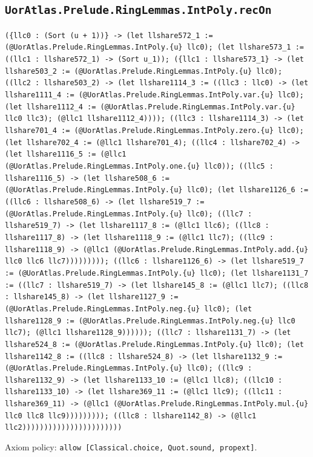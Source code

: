 \documentclass[11pt]{article}
\begin{document}
\subsection*{\texttt{UorAtlas.Prelude.RingLemmas.IntPoly.recOn}}
\noindent\texttt{(\{llc0 : (Sort (u + 1))\} -> (let llshare572\_1 := (@UorAtlas.Prelude.RingLemmas.IntPoly.\{u\} llc0); (let llshare573\_1 := ((llc1 : llshare572\_1) -> (Sort u\_1)); (\{llc1 : llshare573\_1\} -> (let llshare503\_2 := (@UorAtlas.Prelude.RingLemmas.IntPoly.\{u\} llc0); ((llc2 : llshare503\_2) -> (let llshare1114\_3 := ((llc3 : llc0) -> (let llshare1111\_4 := (@UorAtlas.Prelude.RingLemmas.IntPoly.var.\{u\} llc0); (let llshare1112\_4 := (@UorAtlas.Prelude.RingLemmas.IntPoly.var.\{u\} llc0 llc3); (@llc1 llshare1112\_4)))); ((llc3 : llshare1114\_3) -> (let llshare701\_4 := (@UorAtlas.Prelude.RingLemmas.IntPoly.zero.\{u\} llc0); (let llshare702\_4 := (@llc1 llshare701\_4); ((llc4 : llshare702\_4) -> (let llshare1116\_5 := (@llc1 (@UorAtlas.Prelude.RingLemmas.IntPoly.one.\{u\} llc0)); ((llc5 : llshare1116\_5) -> (let llshare508\_6 := (@UorAtlas.Prelude.RingLemmas.IntPoly.\{u\} llc0); (let llshare1126\_6 := ((llc6 : llshare508\_6) -> (let llshare519\_7 := (@UorAtlas.Prelude.RingLemmas.IntPoly.\{u\} llc0); ((llc7 : llshare519\_7) -> (let llshare1117\_8 := (@llc1 llc6); ((llc8 : llshare1117\_8) -> (let llshare1118\_9 := (@llc1 llc7); ((llc9 : llshare1118\_9) -> (@llc1 (@UorAtlas.Prelude.RingLemmas.IntPoly.add.\{u\} llc0 llc6 llc7))))))))); ((llc6 : llshare1126\_6) -> (let llshare519\_7 := (@UorAtlas.Prelude.RingLemmas.IntPoly.\{u\} llc0); (let llshare1131\_7 := ((llc7 : llshare519\_7) -> (let llshare145\_8 := (@llc1 llc7); ((llc8 : llshare145\_8) -> (let llshare1127\_9 := (@UorAtlas.Prelude.RingLemmas.IntPoly.neg.\{u\} llc0); (let llshare1128\_9 := (@UorAtlas.Prelude.RingLemmas.IntPoly.neg.\{u\} llc0 llc7); (@llc1 llshare1128\_9)))))); ((llc7 : llshare1131\_7) -> (let llshare524\_8 := (@UorAtlas.Prelude.RingLemmas.IntPoly.\{u\} llc0); (let llshare1142\_8 := ((llc8 : llshare524\_8) -> (let llshare1132\_9 := (@UorAtlas.Prelude.RingLemmas.IntPoly.\{u\} llc0); ((llc9 : llshare1132\_9) -> (let llshare1133\_10 := (@llc1 llc8); ((llc10 : llshare1133\_10) -> (let llshare369\_11 := (@llc1 llc9); ((llc11 : llshare369\_11) -> (@llc1 (@UorAtlas.Prelude.RingLemmas.IntPoly.mul.\{u\} llc0 llc8 llc9))))))))); ((llc8 : llshare1142\_8) -> (@llc1 llc2)))))))))))))))))))))))}\par
\noindent Axiom policy: \texttt{allow [Classical.choice, Quot.sound, propext]}.\par
\end{document}
